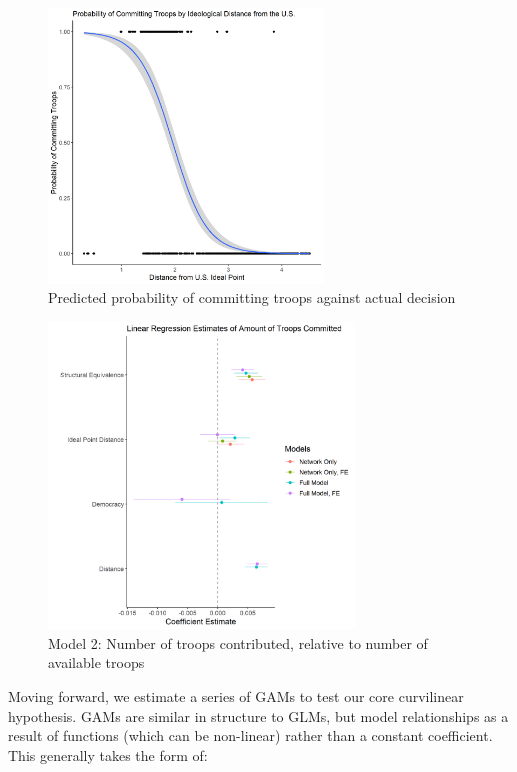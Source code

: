 \documentclass[12pt,letterpaper]{article}
\begin{document}
	\begin{figure}[H]
		\centering
		\includegraphics[width=0.65\textwidth]{figures/logit.png}
		\caption{Predicted probability of committing troops against actual decision}
		\label{fig:logit}
	\end{figure}

	\begin{figure}[H]
		\centering
		\includegraphics[width=0.725\textwidth]{figures/linear_coef.png}
		\caption{Model 2: Number of troops contributed, relative to number of available troops}
		\label{fig:linear_reg}
	\end{figure}
	
	Moving forward, we estimate a series of GAMs to test our core curvilinear hypothesis. GAMs are similar in structure to GLMs, but model relationships as a result of functions (which can be non-linear) rather than a constant coefficient. This generally takes the form of:
	
\end{document}
